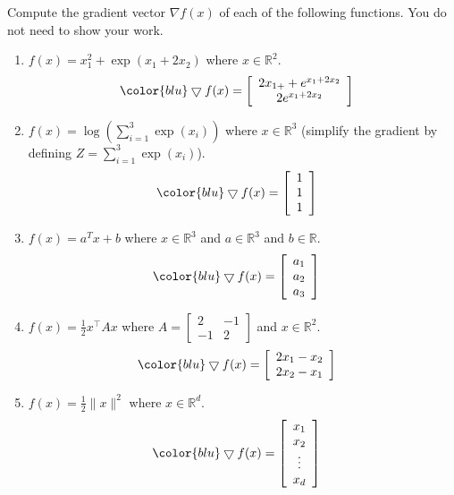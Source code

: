 \documentclass{article}
\def\blu#1{{\color{blu}#1}}
\def\norm#1{\|#1\|}
\def\R{\mathbb{R}}
\def\half{\frac 1 2}
\begin{document}
\blu{Compute the gradient vector $\nabla f(x)$ of each of the following functions.} You do not need to show your work.
\begin{enumerate}
\item $f(x) = x_1^2 + \exp(x_1 + 2x_2)$ where $x \in \R^2$.
\begin{equation}\color{blu} \bigtriangledown f(x)= \left[\begin{array}{c}
2x_{1 + } +e^{x_{1}+2x_{2}}\\
 2e^{x_{1}+2x_{2}}\\
\end{array}\right] \quad \end{equation}
\item $f(x) = \log\left(\sum_{i=1}^3\exp(x_i)\right)$ where $x \in \R^3$ (simplify the gradient by defining $Z = \sum_{i=1}^3\exp(x_i)$).
\begin{equation}\color{blu} \bigtriangledown f(x)=\left[\begin{array}{c}
1\\
1\\
1\\
\end{array}\right] \quad \end{equation}
\item $f(x) = a^Tx + b$ where $x \in \R^3$ and $a \in \R^3$ and $b \in \R$.
\begin{equation}\color{blu} \bigtriangledown f(x)= \left[\begin{array}{c}
a_{1}\\
a_{2}\\
a_{3}\\
\end{array}\right] \quad \end{equation}
\item $f(x) = \half x^\top A x$ where $A=\left[ \begin{array}{cc}
2 & -1 \\
 -1 & 2 \end{array} \right]$ and $x \in \mathbb{R}^2$.
 \begin{equation}\color{blu} \bigtriangledown f(x)=\left[\begin{array}{c}
2x_{1} - x_{2}\\
2x_{2} - x_{1}\\
 \end{array}\right] \quad \end{equation}
 \item $f(x) = \frac{1}{2}\norm{x}^2$ where $x \in \R^d$.
 \begin{equation}\color{blu} \bigtriangledown f(x)=\left[\begin{array}{c}
 x_{1}\\
 x_{2}\\
 \vdots\\
 x_{d}\\
 \end{array}\right] \quad \end{equation}
\end{enumerate}
\end{document}
